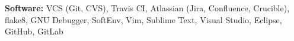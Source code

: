
\vspace{5pt}

\textbf{Software:} VCS (Git, CVS), Travis CI, Atlassian (Jira, Confluence, Crucible), flake8, GNU Debugger, SoftEnv, Vim, Sublime Text, Visual Studio, Eclipse, GitHub, GitLab
